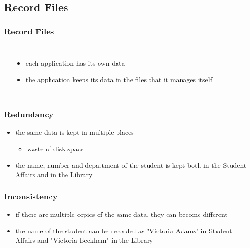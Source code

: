 \documentclass[dvipsnames]{beamer}
\theoremstyle{plain}
\begin{document}
\subsection{Record Files}

\begin{frame}
  \frametitle{Record Files}

  \begin{columns}
    \begin{center}
    \end{center}

    \begin{itemize}
      \item each application has its own data
      \item the application keeps its data in the files that it manages itself
    \end{itemize}
  \end{columns}
\end{frame}

\begin{frame}
  \frametitle{Redundancy}

  \begin{itemize}
    \item the same data is kept in multiple places
    \begin{itemize}
      \item waste of disk space
    \end{itemize}
  \end{itemize}

  \pause
  \begin{example}
    \begin{itemize}
      \item the name, number and department of the student is kept both in the
        Student Affairs and in the Library
    \end{itemize}
  \end{example}
\end{frame}

\begin{frame}
  \frametitle{Inconsistency}

  \begin{itemize}
    \item if there are multiple copies of the same data, they can become
      different
  \end{itemize}

  \pause
  \begin{example}
    \begin{itemize}
      \item the name of the student can be recorded as "Victoria Adams" in
        Student Affairs and "Victoria Beckham" in the Library
    \end{itemize}
  \end{example}
\end{frame}
\end{document}
